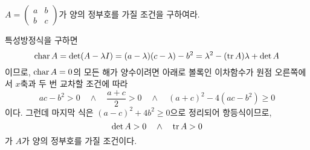 \documentclass[../engineering_mathematics_lecture_note.tex]{subfiles}
\begin{document}
\begin{example}
    $A = \begin{pmatrix}a & b\\b & c\end{pmatrix}$가 양의 정부호를 가질 조건을 구하여라.
    \begin{solution}
        특성방정식을 구하면
        \begin{equation*}
            \operatorname{char} A = \det(A - \lambda I) = (a - \lambda)(c - \lambda) - b^2 = \lambda^2 - (\operatorname{tr} A) \lambda + \det A
        \end{equation*}
        이므로, $\operatorname{char} A = 0$의 모든 해가 양수이려면 아래로 볼록인 이차함수가 원점 오른쪽에서 $x$축과 두 번 교차할 조건에 따라
        \begin{equation*}
            ac - b^2 > 0 \quad \wedge \quad \frac{a + c}{2} > 0 \quad \wedge \quad (a + c)^2 - 4(ac - b^2) \geq 0
        \end{equation*}
        이다.
        그런데 마지막 식은 $(a - c)^2 + 4b^2 \geq 0$으로 정리되어 항등식이므로,
        \begin{equation*}
            \det A > 0 \quad \wedge \quad \operatorname{tr} A > 0
        \end{equation*}
        가 $A$가 양의 정부호를 가질 조건이다.
    \end{solution}
\end{example}
\end{document}
